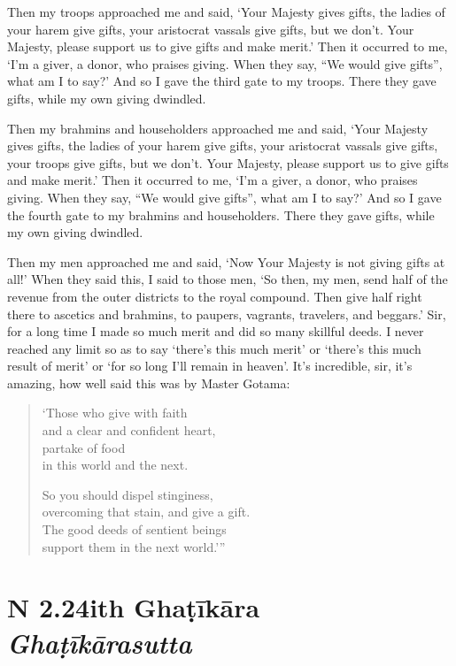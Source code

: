 \documentclass[12pt,openany]{book}%
\newcommand*{\suttatitleacronym}[1]{\smaller[2]{#1}\vspace*{.3em}}
\newcommand*{\suttatitletranslation}[1]{\linebreak{#1}}
\newcommand*{\suttatitleroot}[1]{\linebreak\smaller[2]\itshape{#1}}
\newcommand*{\tocacronym}[1]{\hspace*{-3.3em}{#1}\quad}
\newcommand*{\toctranslation}[1]{#1}
\newcommand*{\tocroot}[1]{(\textit{#1})}
\begin{document}
Then my troops approached me and said, ‘Your Majesty gives gifts, the ladies of your harem give gifts, your aristocrat vassals give gifts, but we don’t. Your Majesty, please support us to give gifts and make merit.’ Then it occurred to me, ‘I’m a giver, a donor, who praises giving. When they say, “We would give gifts”, what am I to say?’ And so I gave the third gate to my troops. There they gave gifts, while my own giving dwindled. 

Then my brahmins and householders approached me and said, ‘Your Majesty gives gifts, the ladies of your harem give gifts, your aristocrat vassals give gifts, your troops give gifts, but we don’t. Your Majesty, please support us to give gifts and make merit.’ Then it occurred to me, ‘I’m a giver, a donor, who praises giving. When they say, “We would give gifts”, what am I to say?’ And so I gave the fourth gate to my brahmins and householders. There they gave gifts, while my own giving dwindled. 

Then my men approached me and said, ‘Now Your Majesty is not giving gifts at all!’ When they said this, I said to those men, ‘So then, my men, send half of the revenue from the outer districts to the royal compound. Then give half right there to ascetics and brahmins, to paupers, vagrants, travelers, and beggars.’ Sir, for a long time I made so much merit and did so many skillful deeds. I never reached any limit so as to say ‘there’s this much merit’ or ‘there’s this much result of merit’ or ‘for so long I’ll remain in heaven’. It’s incredible, sir, it’s amazing, how well said this was by Master Gotama: 

\begin{verse}%
‘Those who give with faith \\
and a clear and confident heart, \\
partake of food \\
in this world and the next. 

So you should dispel stinginess, \\
overcoming that stain, and give a gift. \\
The good deeds of sentient beings \\
support them in the next world.’” 

%
\end{verse}

%
\section*{{\suttatitleacronym SN 2.24}{\suttatitletranslation With Ghaṭīkāra }{\suttatitleroot Ghaṭīkārasutta}}
\addcontentsline{toc}{section}{\tocacronym{SN 2.24} \toctranslation{With Ghaṭīkāra } \tocroot{Ghaṭīkārasutta}}
\end{document}
